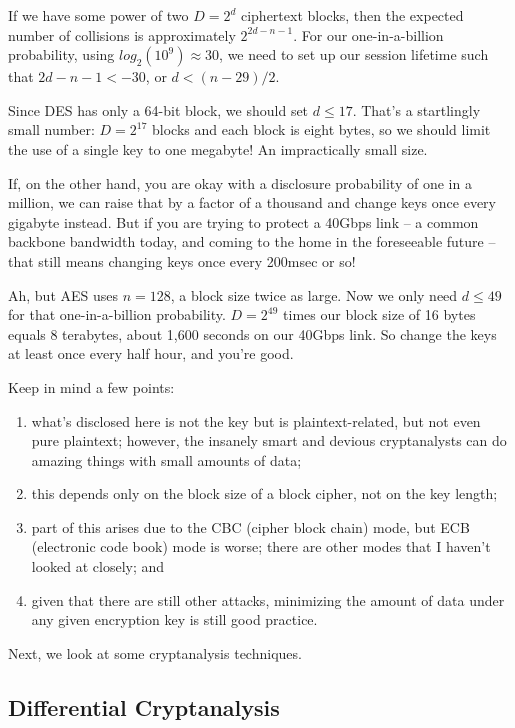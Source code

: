 If we have some power of two $D = 2^d$ ciphertext blocks, then the
expected number of collisions is approximately $2^{2d-n-1}$.  For our
one-in-a-billion probability, using $log_2(10^9) \approx 30$, we need
to set up our session lifetime such that $2d-n-1 < -30$, or $d <
(n-29)/2$.

Since DES has only a 64-bit block, we should set $d \le 17$.  That's a
startlingly small number: $D = 2^{17}$ blocks and each block is eight
bytes, so we should limit the use of a single key to one megabyte!
An impractically small size.

If, on the other hand, you are okay with a disclosure probability of
one in a million, we can raise that by a factor of a thousand and
change keys once every gigabyte instead.  But if you are trying to
protect a 40Gbps link -- a common backbone bandwidth today, and coming
to the home in the foreseeable future -- that still means changing
keys once every 200msec or so!

Ah, but AES uses $n = 128$, a block size twice as large.  Now we only
need $d \le 49$ for that one-in-a-billion probability.  $D = 2^{49}$
times our block size of 16 bytes equals 8 terabytes, about 1,600
seconds on our 40Gbps link.  So change the keys at least once every
half hour, and you're good. 

Keep in mind a few points:
\begin{enumerate}
\item what's disclosed here is not the key but is plaintext-related, but
   not even pure plaintext; however, the insanely smart and devious
   cryptanalysts can do amazing things with small amounts of data;
\item this depends only on the block size of a block cipher, not on the
   key length;
\item part of this arises due to the CBC (cipher block chain) mode, but
   ECB (electronic code book) mode is worse; there are other modes
   that I haven't looked at closely; and
\item given that there are still other attacks, minimizing the amount of
   data under any given encryption key is still good practice.
\end{enumerate}

Next, we look at some cryptanalysis techniques.

\subsection{Differential Cryptanalysis}

